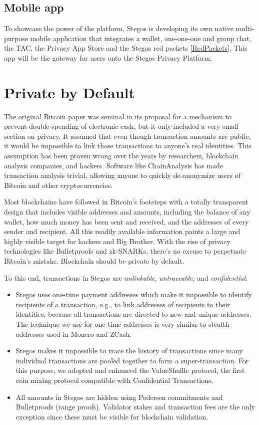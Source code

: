 \documentclass[8pt,fleqn,openany]{book}
\begin{document}
\subsection{Mobile app}
To showcase the power of the platform, Stegos is developing its own native multi-purpose mobile application that integrates a wallet, one-one-one and group chat, the TAC, the Privacy App Store and the Stegos red packets \ref{RedPackets}. This app will be the gateway for users onto the Stegos Privacy Platform.


\section{Private by Default}
The original Bitcoin paper was seminal in its proposal for a mechanism to prevent double-spending of electronic cash, but it only included a very small section on privacy\cite{c1}. It assumed that even though transaction amounts are public, it would be impossible to link those transactions to anyone’s real identities. This assumption has been proven wrong over the years by researchers, blockchain analysis companies, and hackers. Software like ChainAnalysis has made transaction analysis trivial, allowing anyone to quickly de-anonymize users of Bitcoin and other cryptocurrencies.

Most blockchains have followed in Bitcoin’s footsteps with a totally transparent design that includes visible addresses and amounts, including the balance of any wallet, how much money has been sent and received, and the addresses of every sender and recipient. All this readily available information paints a large and highly visible target for hackers and Big Brother. With the rise of privacy technologies like Bulletproofs and zk-SNARKs, there’s no excuse to perpetuate Bitcoin’s mistake. Blockchain should be private by default.

To this end, transactions in Stegos are \textit{unlinkable}, \textit{untraceable}, and \textit{confidential}:

\begin{itemize}
	\item Stegos uses one-time payment addresses which make it impossible to identify recipients of a transaction, e.g., to link addresses of recipients to their identities, because all transactions are directed to new and unique addresses. The technique we use for one-time addresses is very similar to stealth addresses used in Monero and ZCash.
	\item Stegos makes it impossible to trace the history of transactions since many individual transactions are pooled together to form a super-transaction. For this purpose, we adopted and enhanced the ValueShuffle protocol\cite{c7}, the first coin mixing protocol compatible with Confidential Transactions.
	\item All amounts in Stegos are hidden using Pedersen commitments\cite{c8} and Bulletproofs (range proofs)\cite{c4}. Validator stakes and transaction fees are the only exception since these must be visible for blockchain validation.\end{itemize}
\end{document}
